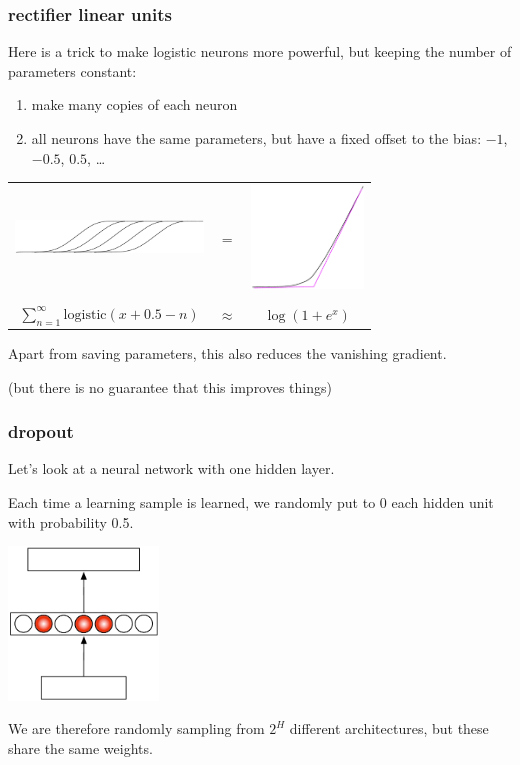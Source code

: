\documentclass[USenglish,pdftex,compress,10pt,svgnamesi,handout]{beamer}
\begin{document}
\begin{frame}
\frametitle{rectifier linear units}

Here is a trick to make logistic neurons more powerful, but keeping the number of parameters constant:
\begin{enumerate}
\item make many copies of each neuron
\item all neurons have the same parameters, but have a fixed offset to the bias: $-1$, $-0.5$, $0.5$, \dots
\end{enumerate}

\begin{tabular}{ccc}
{\includegraphics[width=5cm]{pics/sumlog.pdf}}
&=&
{\includegraphics[width=3cm]{pics/rect.pdf}}
\\
&&\\
$\sum_{n=1}^\infty \mathrm{logistic}(x + 0.5 - n)$
&$\approx$&
$\log(1 + e^x)$
\end{tabular}
\vskip1cm
Apart from saving parameters, this also reduces the vanishing gradient.

(but there is no guarantee that this improves things)
\end{frame}


\begin{frame}
\frametitle{dropout}
Let's look at a neural network with one hidden layer.

Each time a learning sample is learned, we randomly put to 0 each hidden unit with probability 0.5.

\centerline{\includegraphics[width=4cm]{pics/dropout.pdf}}

We are therefore randomly sampling from $2^H$ different architectures, but these share the same weights.

\end{frame}
\end{document}
